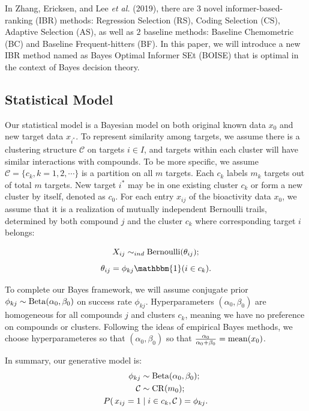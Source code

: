 \documentclass[12pt]{article}
\begin{document}
In Zhang, Ericksen, and Lee {\em et al.} (2019), there are $3$ novel informer-based-ranking (IBR) methods: Regression Selection (RS), Coding Selection (CS), Adaptive Selection (AS), as well as $2$ baseline methods: Baseline Chemometric (BC) and Baseline Frequent-hitters (BF). In this paper, we will introduce a new IBR method named as Bayes Optimal Informer SEt (BOISE) that is optimal in the context of Bayes decision theory.

\subsection{Statistical Model}

Our statistical model is a Bayesian model on both original known data $x_0$ and new target data $x_{i^*}$. 
To represent similarity among targets, we assume there is a clustering structure $\mathcal{C}$ on targets $i\in I$, and targets within each cluster will have similar interactions with compounds. 
To be more specific, we assume $\mathcal{C} = \{c_k, k = 1,2,\cdots\}$ is a partition on all $m$ targets. Each $c_k$ labels $m_k$ targets out of total $m$ targets. New target $i^*$ may be in one existing cluster $c_k$ or form a new cluster by itself, denoted as $c_0$. For each entry $x_{ij}$ of the bioactivity data $x_0$, we assume that it is a realization of mutually independent Bernoulli trails,  determined by both compound $j$ and the cluster $c_k$ where corresponding target $i$ belongs: 

$$
X_{ij}\sim_{ind} {\rm Bernoulli}(\theta_{ij});$$$$
\theta_{ij} = \phi_{kj}\mathbbm{1}(i\in c_k).
$$

To complete our Bayes framework, we will assume conjugate prior  $\phi_{kj}\sim {\rm Beta}(\alpha_0, \beta_0)$ on success rate $\phi_{kj}$. Hyperparameters $(\alpha_0,\beta_0)$ are homogeneous for all compounds $j$ and clusters $c_k$, meaning we have no preference on compounds or clusters. Following the ideas of empirical Bayes methods,  we choose hyperparameteres so that $(\alpha_0,\beta_0)$ so that $\frac{\alpha_0}{\alpha_0+\beta_0} = {\rm mean}(x_0)$. 

In summary, our generative model is:
\begin{align}
\label{eq:model}
\begin{split}
    \phi_{kj}&\sim {\rm Beta}(\alpha_0,\beta_0);\\
\mathcal{C} &\sim {\rm CR}(m_0);\\
P(\,x_{ij}=1&\mid i\in c_k, \mathcal{C}\,)= \phi_{kj}.
\end{split}
\end{align}
\end{document}
